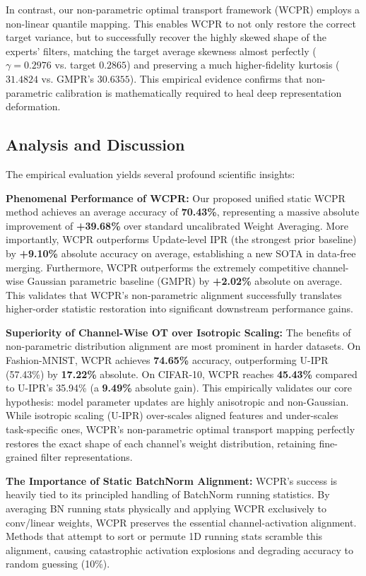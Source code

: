 \documentclass{article}
\theoremstyle{plain}
\theoremstyle{definition}
\theoremstyle{remark}
\begin{document}
In contrast, our non-parametric optimal transport framework (WCPR) employs a non-linear quantile mapping. This enables WCPR to not only restore the correct target variance, but to successfully recover the highly skewed shape of the experts' filters, matching the target average skewness almost perfectly ($\gamma = 0.2976$ vs. target $0.2865$) and preserving a much higher-fidelity kurtosis ($31.4824$ vs. GMPR's $30.6355$). This empirical evidence confirms that non-parametric calibration is mathematically required to heal deep representation deformation.

\subsection{Analysis and Discussion}

The empirical evaluation yields several profound scientific insights:

\textbf{Phenomenal Performance of WCPR:} Our proposed unified static WCPR method achieves an average accuracy of \textbf{70.43\%}, representing a massive absolute improvement of \textbf{+39.68\%} over standard uncalibrated Weight Averaging. More importantly, WCPR outperforms Update-level IPR (the strongest prior baseline) by \textbf{+9.10\%} absolute accuracy on average, establishing a new SOTA in data-free merging. Furthermore, WCPR outperforms the extremely competitive channel-wise Gaussian parametric baseline (GMPR) by \textbf{+2.02\%} absolute on average. This validates that WCPR's non-parametric alignment successfully translates higher-order statistic restoration into significant downstream performance gains.

\textbf{Superiority of Channel-Wise OT over Isotropic Scaling:} The benefits of non-parametric distribution alignment are most prominent in harder datasets. On Fashion-MNIST, WCPR achieves \textbf{74.65\%} accuracy, outperforming U-IPR (57.43\%) by \textbf{17.22\%} absolute. On CIFAR-10, WCPR reaches \textbf{45.43\%} compared to U-IPR's 35.94\% (a \textbf{9.49\%} absolute gain). This empirically validates our core hypothesis: model parameter updates are highly anisotropic and non-Gaussian. While isotropic scaling (U-IPR) over-scales aligned features and under-scales task-specific ones, WCPR's non-parametric optimal transport mapping perfectly restores the exact shape of each channel's weight distribution, retaining fine-grained filter representations.

\textbf{The Importance of Static BatchNorm Alignment:} WCPR's success is heavily tied to its principled handling of BatchNorm running statistics. By averaging BN running stats physically and applying WCPR exclusively to conv/linear weights, WCPR preserves the essential channel-activation alignment. Methods that attempt to sort or permute 1D running stats scramble this alignment, causing catastrophic activation explosions and degrading accuracy to random guessing (10\%).
\end{document}
